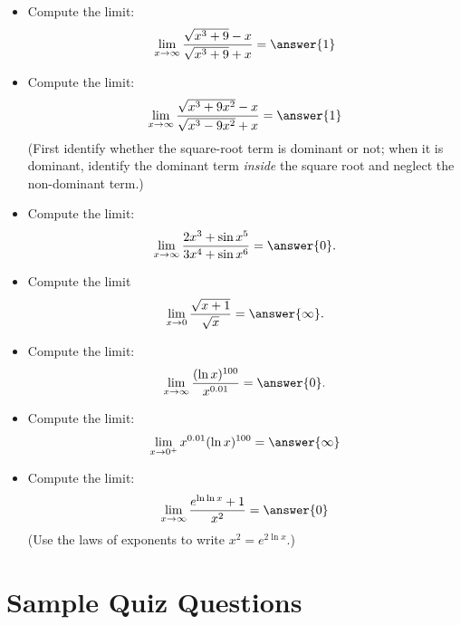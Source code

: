 \documentclass{ximera}
\begin{document}
\begin{exercise}
\begin{itemize}
\begin{multipleChoice}
\end{multipleChoice}
\item Compute the limit:
\[ \lim_{x \rightarrow \infty} \frac{\sqrt{x^3 + 9} - x}{\sqrt{x^3 + 9} + x} = \answer{1} \]
\begin{multipleChoice}
\end{multipleChoice}
\item Compute the limit:
\[ \lim_{x \rightarrow \infty} \frac{\sqrt{x^3 + 9x^2} - x}{\sqrt{x^3 - 9x^2} + x} = \answer{1} \]
(First identify whether the square-root term is dominant or not; when it is dominant, identify the dominant term \textit{inside} the square root and neglect the non-dominant term.)
\item Compute the limit:
\[ \lim_{x \rightarrow \infty} \frac{ 2 x^3 + \sin x^5}{ 3 x^4 + \sin x^6} = \answer{0}. \]
\item Compute the limit
\[ \lim_{x \rightarrow 0} \frac{\sqrt{x + 1}}{\sqrt{x}} = \answer{\infty}. \]
\begin{multipleChoice}
\end{multipleChoice}
\item Compute the limit:
\[ \lim_{x \rightarrow \infty} \frac{ (\ln x)^{100}}{x^{0.01}} = \answer{0}. \]
\begin{multipleChoice}
\end{multipleChoice}
\item Compute the limit:
\[ \lim_{x \rightarrow 0^+} x^{0.01} (\ln x)^{100} = \answer{\infty} \]
\begin{multipleChoice}
\end{multipleChoice}
\item Compute the limit:
\[ \lim_{x \rightarrow \infty} \frac{e^{\ln \ln x}+1}{x^2} = \answer{0} \]
(Use the laws of exponents to write $x^2 = e^{2 \ln x}$.)
\end{itemize}
\end{exercise}



\section*{Sample Quiz Questions}
\end{document}
